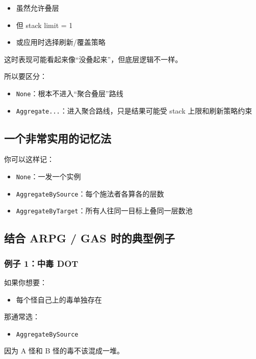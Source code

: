 \begin{itemize}
	\item 虽然允许叠层
	\item 但 stack limit = 1
	\item 或应用时选择刷新/覆盖策略
\end{itemize}

这时表现可能看起来像“没叠起来”，但底层逻辑不一样。

所以要区分：

\begin{itemize}
	\item \texttt{None}：根本不进入“聚合叠层”路线
	\item \texttt{Aggregate...}：进入聚合路线，只是结果可能受 stack 上限和刷新策略约束
\end{itemize}

\subsection{一个非常实用的记忆法}

你可以这样记：

\begin{itemize}
	\item \texttt{None}：一发一个实例
	\item \texttt{AggregateBySource}：每个施法者各算各的层数
	\item \texttt{AggregateByTarget}：所有人往同一目标上叠同一层数池
\end{itemize}

\subsection{结合 ARPG / GAS 时的典型例子}

\subsubsection*{例子 1：中毒 DOT}
如果你想要：

\begin{itemize}
	\item 每个怪自己上的毒单独存在
\end{itemize}

那通常选：

\begin{itemize}
	\item \texttt{AggregateBySource}
\end{itemize}

因为 A 怪和 B 怪的毒不该混成一堆。

